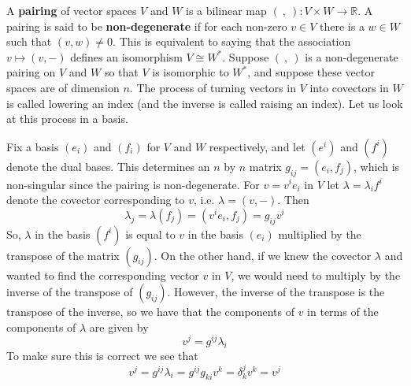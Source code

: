 A \textbf{pairing} of vector spaces $V$ and $W$ is a bilinear map $( \ , \ ) : V \times W \rightarrow \mathbb R$. A pairing is said to be \textbf{non-degenerate} if for each non-zero $v \in V$ there is a $w \in W$ such that $(v,w) \neq 0$. This is equivalent to saying that the association $v \mapsto (v,-)$ defines an isomorphism $V \cong W^*$. Suppose $(\ ,\ )$ is a non-degenerate pairing on $V$ and $W$ so that $V$ is isomorphic to $W^*$, and suppose these vector spaces are of dimension $n$. The process of turning vectors in $V$ into covectors in $W$ is called lowering an index (and the inverse is called raising an index). Let us look at this process in a basis.

Fix a basis $(e_i)$ and $(f_i)$ for $V$ and $W$ respectively, and let $(e^i)$ and $(f^i)$ denote the dual bases. This determines an $n$ by $n$ matrix $g_{ij} = (e_i,f_j)$, which is non-singular since the pairing is non-degenerate. For $v = v^i e_i$ in $V$ let $\lambda = \lambda_i f^i$ denote the covector corresponding to $v$, i.e. $\lambda = (v,-)$. Then 
\begin{equation}
\label{pairing - lowering index}
\lambda_j = \lambda(f_j) = \left( v^i e_i, f_j \right) = g_{ij} v^i
\end{equation}
So, $\lambda$ in the basis $(f^i)$ is equal to $v$ in the basis $(e_i)$ multiplied by the transpose of the matrix $(g_{ij})$. On the other hand, if we knew the covector $\lambda$ and wanted to find the corresponding vector $v$ in $V$, we would need to multiply by the inverse of the transpose of $(g_{ij})$. However, the inverse of the transpose is the transpose of the inverse, so we have that the components of $v$ in terms of the components of $\lambda$ are given by
\begin{equation}
\label{pairing - raising index}
v^j = g^{ij} \lambda_i
\end{equation}
To make sure this is correct we see that
\[ v^j = g^{ij} \lambda_i = g^{ij} g_{ki} v^k = \delta_k^j v^k = v^j \]


